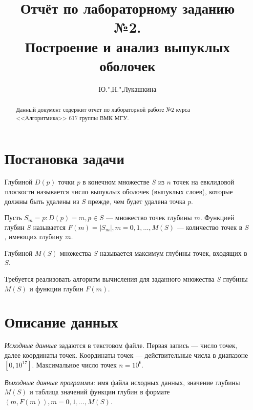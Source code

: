 \documentclass[twoside]{article}
\begin{document}
	\title[Лабораторная работа №2]{Отчёт по лабораторному заданию №2.\\ Построение и анализ выпуклых оболочек}
	\author{Ю.",Н.",Лукашкина}
	\maketitle
	\begin{abstract}
		Данный документ содержит отчет по лабораторной работе №2 курса <<Алгоритмика>> 617 группы ВМК МГУ.
	\end{abstract}
	
	
\section{Постановка задачи}
Глубиной $D(p)$ точки $p$ в конечном множестве $S$ из $n$ точек на евклидовой плоскости
называется число выпуклых оболочек (выпуклых слоев), которые должны быть удалены из
$S$ прежде, чем будет удалена точка $p$.

Пусть $S_m= {p: D(p)=m, p \in S}$ --- множество точек глубины $m$.
Функцией глубин $S$ называется $F(m)=|S_m|, m = 0,1,\dots,M(S)$ --- количество точек в $S$,
имеющих глубину $m$.

Глубиной $M(S)$ множества $S$ называется максимум глубины точек, входящих в $S$.

Требуется реализовать алгоритм вычисления для заданного множества $S$ глубины $M(S)$ и функции глубин $F(m)$.

\section{Описание данных}
\textit{Исходные данные }задаются в текстовом файле. Первая запись --- число точек, далее
координаты точек. Координаты точек --- действительные числа в диапазоне $[0, 10^{17}]$.
Максимальное число точек $n=10^6$.

\textit{Выходные данные программы}: имя файла исходных данных, значение глубины $M(S)$
и таблица значений функции глубин в формате $(m, F(m)), m = 0,1, \dots, M(S)$.
\end{document}
